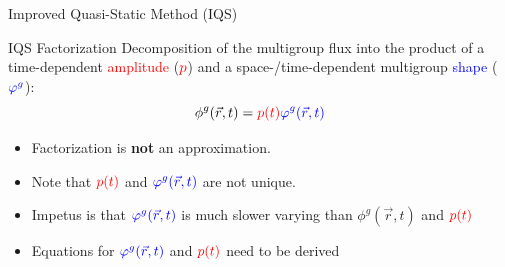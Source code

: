 \documentclass[8pt,xcolor=dvipnames]{beamer}
\newcommand{\be}{\begin{equation*}}
\newcommand{\ee}{\end{equation*}}
\newcommand{\tcr}[1]{\textcolor{red}{#1}}
\newcommand{\tcb}[1]{\textcolor{blue}{#1}}
\begin{document}
\begin{frame}{Improved Quasi-Static Method (IQS)}

\vspace{-3mm}

\begin{block}{IQS Factorization}
Decomposition of the multigroup flux into the product of a time-dependent \tcr{amplitude} ($\tcr{p}$) and a space-/time-dependent multigroup \tcb{shape} ($\tcb{\varphi^g}$):
\be
\phi^g(\vec{r},t) = \tcr{p(t)} \tcb{\varphi^g(\vec{r},t)}
\ee
\vspace{-5mm}
\begin{itemize}
\item Factorization is \textbf{not} an approximation.
\item Note that $\tcr{p(t)}$ and $\tcb{\varphi^g(\vec{r},t)}$ are not unique. 
\item Impetus is that $\tcb{\varphi^g(\vec{r},t)}$ is much slower varying than $\phi^g(\vec{r},t)$ and $\tcr{p(t)}$
\item Equations for $\tcb{\varphi^g(\vec{r},t)}$ and $\tcr{p(t)}$ need to be derived
\end{itemize}
\end{block}

\end{frame}
\end{document}
